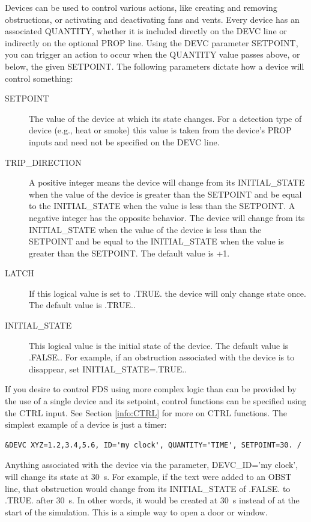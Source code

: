 \documentclass[11pt]{book}
\begin{document}
Devices can be used to control various actions, like creating and removing obstructions, or activating and deactivating
fans and vents. Every device has an associated {\ct QUANTITY}, whether it is included directly on the {\ct DEVC} line or
indirectly on the optional {\ct PROP} line. Using the {\ct DEVC} parameter {\ct SETPOINT}, you can trigger an action to
occur when the {\ct QUANTITY} value passes above, or below, the given {\ct SETPOINT}.
The following parameters dictate how a device will control something:
\begin{description}
\item[{\ct SETPOINT}] The value of the device at which its state changes.  For a detection type of device (e.g., heat or smoke) this value is taken from the device's {\ct PROP} inputs and need not be specified on the {\ct DEVC} line.
\item[{\ct TRIP\_DIRECTION}] A positive integer means the device will change from its {\ct INITIAL\_STATE} when the value of the device is greater than the {\ct SETPOINT} and be equal to the {\ct INITIAL\_STATE} when the value is less than the {\ct SETPOINT}. A negative integer has the opposite behavior. The device will change from its {\ct INITIAL\_STATE} when the value of the device is less than the {\ct SETPOINT} and be equal to the {\ct INITIAL\_STATE} when the value is greater than the {\ct SETPOINT}. The default value is +1.
\item[{\ct LATCH}] If this logical value is set to {\ct .TRUE.} the device will only change state once. The default value is {\ct .TRUE.}.
\item[{\ct INITIAL\_STATE}] This logical value is the initial state of the device. The default value is {\ct .FALSE.}. For example, if an obstruction associated with the device is to disappear, set {\ct INITIAL\_STATE=.TRUE.}.
\end{description}
If you desire to control FDS using more complex logic than can be provided
by the use of a single device and its setpoint, control functions can be specified using the {\ct CTRL} input.
See Section \ref{info:CTRL} for more on {\ct CTRL} functions.
The simplest example of a device is just a timer:
\begin{lstlisting}
&DEVC XYZ=1.2,3.4,5.6, ID='my clock', QUANTITY='TIME', SETPOINT=30. /
\end{lstlisting}
Anything associated with the device via the parameter, {\ct DEVC\_ID='my clock'}, will change its state at 30~s. For example, if the text were added to an {\ct OBST} line, that obstruction would change from its {\ct INITIAL\_STATE} of {\ct .FALSE.} to {\ct .TRUE.} after 30~s. In other words, it would be created at 30~s instead of at the start of the simulation. This is a simple way to open a door or window.
\end{document}
